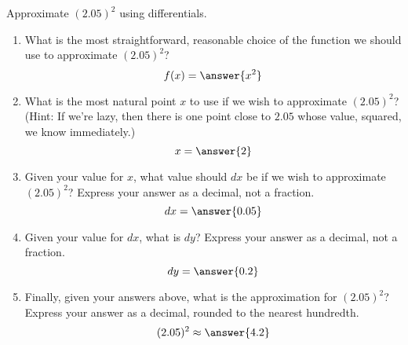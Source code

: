 \documentclass{ximera}
\author{Gregory Hartman \and Matthew Carr}
\begin{document}
\begin{exercise}




Approximate $(2.05)^2$ using differentials.
\begin{enumerate}
\item		What is the most straightforward, reasonable choice of the function we should use to approximate $(2.05)^2$?\[f(x)=\answer{x^2}\]
\item		What is the most natural point $x$ to use if we wish to approximate $(2.05)^2$? (Hint: If we're lazy, then there is one point close to $2.05$ whose value, squared, we know immediately.) \[x=\answer{2}\]
\item		Given your value for $x$, what value should $dx$ be if we wish to approximate $(2.05)^2$? Express your answer as a decimal, not a fraction. \[dx=\answer{0.05}\]
\item		Given your value for $dx$, what is $dy$? Express your answer as a decimal, not a fraction. \[dy=\answer{0.2}\]
\item		Finally, given your answers above, what is the approximation for $(2.05)^2$? Express your answer as a decimal, rounded to the nearest hundredth. \[(2.05)^2\approx\answer{4.2}\]
\end{enumerate}


\end{exercise}
\end{document}
